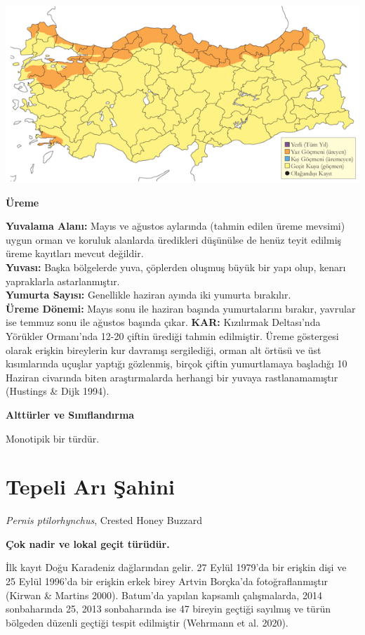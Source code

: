 \documentclass[
  letterpaper,
  DIV=11,
  numbers=noendperiod]{scrreprt}
\begin{document}
\includegraphics{images/harita_Page_085.png}

\textbf{Üreme}

\textbf{Yuvalama Alanı:} Mayıs ve ağustos aylarında (tahmin edilen üreme
mevsimi) uygun orman ve koruluk alanlarda üredikleri düşünülse de henüz
teyit edilmiş üreme kayıtları mevcut değildir.\\
\textbf{Yuvası:} Başka bölgelerde yuva, çöplerden oluşmuş büyük bir yapı
olup, kenarı yapraklarla astarlanmıştır.\\
\textbf{Yumurta Sayısı:} Genellikle haziran ayında iki yumurta
bırakılır.\\
\textbf{Üreme Dönemi:} Mayıs sonu ile haziran başında yumurtalarını
bırakır, yavrular ise temmuz sonu ile ağustos başında çıkar.
\textbf{KAR:} Kızılırmak Deltası'nda Yörükler Ormanı'nda 12-20 çiftin
ürediği tahmin edilmiştir. Üreme göstergesi olarak erişkin bireylerin
kur davranışı sergilediği, orman alt örtüsü ve üst kısımlarında uçuşlar
yaptığı gözlenmiş, birçok çiftin yumurtlamaya başladığı 10 Haziran
civarında biten araştırmalarda herhangi bir yuvaya rastlanamamıştır
(Hustings \& Dijk 1994).

\textbf{Alttürler ve Sınıflandırma}

Monotipik bir türdür.

\section{Tepeli Arı Şahini}\label{tepeli-arux131-ux15fahini}

\emph{Pernis ptilorhynchus}, Crested Honey Buzzard

\textbf{Çok nadir ve lokal geçit türüdür.}

İlk kayıt Doğu Karadeniz dağlarından gelir. 27 Eylül 1979'da bir erişkin
dişi ve 25 Eylül 1996'da bir erişkin erkek birey Artvin Borçka'da
fotoğraflanmıştır (Kirwan \& Martins 2000). Batum'da yapılan kapsamlı
çalışmalarda, 2014 sonbaharında 25, 2013 sonbaharında ise 47 bireyin
geçtiği sayılmış ve türün bölgeden düzenli geçtiği tespit edilmiştir
(Wehrmann et al. 2020).
\end{document}
